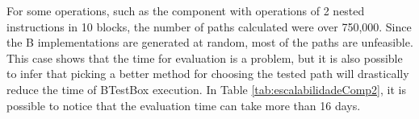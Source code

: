 \documentclass[runningheads]{llncs}
\begin{document}
For some operations, such as the component with operations of 2 nested instructions in 10 blocks, the number of paths calculated were over 750,000. Since the B implementations are generated at random, most of the paths are unfeasible. This case shows that the time for evaluation is a problem, but it is also possible to infer that picking a better method for choosing the tested path will drastically reduce the time of BTestBox execution. In Table \ref{tab:escalabilidadeComp2}, it is possible to notice that the evaluation time can take more than 16 days.

\begin{table}[h!]
\centering
\caption{Scalability test for the COMP\_2seq10 implementation}
\label{tab:escalabilidadeComp2}
\end{table}
\end{document}
